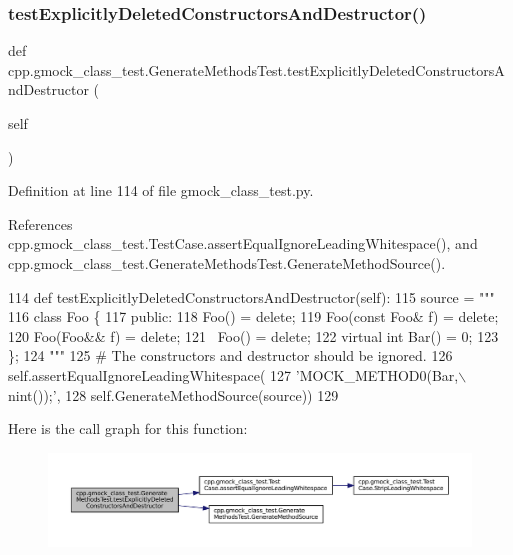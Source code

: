\subsubsection{\texorpdfstring{test\+Explicitly\+Deleted\+Constructors\+And\+Destructor()}{testExplicitlyDeletedConstructorsAndDestructor()}}
{\footnotesize\ttfamily def cpp.\+gmock\+\_\+class\+\_\+test.\+Generate\+Methods\+Test.\+test\+Explicitly\+Deleted\+Constructors\+And\+Destructor (\begin{DoxyParamCaption}\item[{}]{self }\end{DoxyParamCaption})}



Definition at line 114 of file gmock\+\_\+class\+\_\+test.\+py.



References cpp.\+gmock\+\_\+class\+\_\+test.\+Test\+Case.\+assert\+Equal\+Ignore\+Leading\+Whitespace(), and cpp.\+gmock\+\_\+class\+\_\+test.\+Generate\+Methods\+Test.\+Generate\+Method\+Source().


\begin{DoxyCode}
114   \textcolor{keyword}{def }testExplicitlyDeletedConstructorsAndDestructor(self):
115     source = \textcolor{stringliteral}{"""}
116 \textcolor{stringliteral}{class Foo \{}
117 \textcolor{stringliteral}{ public:}
118 \textcolor{stringliteral}{  Foo() = delete;}
119 \textcolor{stringliteral}{  Foo(const Foo& f) = delete;}
120 \textcolor{stringliteral}{  Foo(Foo&& f) = delete;}
121 \textcolor{stringliteral}{  ~Foo() = delete;}
122 \textcolor{stringliteral}{  virtual int Bar() = 0;}
123 \textcolor{stringliteral}{\};}
124 \textcolor{stringliteral}{"""}
125     \textcolor{comment}{# The constructors and destructor should be ignored.}
126     self.assertEqualIgnoreLeadingWhitespace(
127         \textcolor{stringliteral}{'MOCK\_METHOD0(Bar,\(\backslash\)nint());'},
128         self.GenerateMethodSource(source))
129 
\end{DoxyCode}
Here is the call graph for this function\+:
\nopagebreak
\begin{figure}[H]
\begin{center}
\leavevmode
\includegraphics[width=350pt]{classcpp_1_1gmock__class__test_1_1GenerateMethodsTest_a4e6c2d2de1e21e63672ebbb75676c45c_cgraph}
\end{center}
\end{figure}
\mbox{\label{classcpp_1_1gmock__class__test_1_1GenerateMethodsTest_a4db373bb8953d0523425b5a3f392e761}} 

